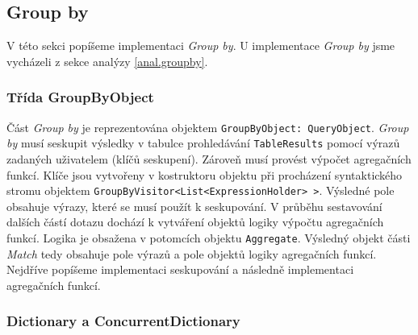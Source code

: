 \subsection{Group by}

V této sekci popíšeme implementaci \textit{Group by}.
U implementace \textit{Group by} jsme vycházeli z sekce analýzy \ref{anal.groupby}.

\subsubsection{Třída GroupByObject}

Část \textit{Group by} je reprezentována objektem \texttt{GroupByObject: QueryObject}.
\textit{Group by} musí seskupit výsledky v tabulce prohledávání \texttt{TableResults} pomocí výrazů zadaných uživatelem (klíčů seskupení).
Zároveň musí provést výpočet agregačních funkcí.
Klíče jsou vytvořeny v kostruktoru objektu při procházení syntaktického stromu objektem \texttt{GroupByVisitor<List<ExpressionHolder> >}.
Výsledné pole obsahuje výrazy, které se musí použít k seskupování.
V průběhu sestavování dalších částí dotazu dochází k vytváření objektů logiky výpočtu agregačních funkcí.
Logika je obsažena v potomcích objektu \texttt{Aggregate}.
Výsledný objekt části \textit{Match} tedy obsahuje pole výrazů a pole objektů logiky agregačních funkcí.
Nejdříve popíšeme implementaci seskupování a následně implementaci agregačních funkcí.

\subsubsection{Dictionary a ConcurrentDictionary}

